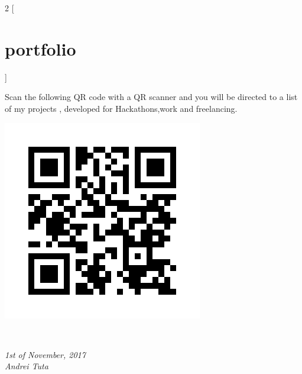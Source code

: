 \documentclass[]{friggeri-cv}
\begin{document}
\begin{multicols}{2}
[
\section{portfolio}
]

Scan the following QR code with a QR scanner and you will be directed to a list of my projects , developed for Hackathons,work and freelancing.
    
   \begin{flushright}
   \includegraphics[scale=0.20]{img/static_qr_code_without_logo.jpg}
\end{flushright}

   
\end{multicols}
\\
\begin{flushleft}
\emph{1st of November, 2017}
\\
\emph{Andrei Tuta}
\end{flushleft}
\end{document}
